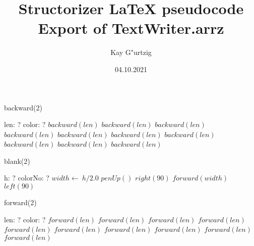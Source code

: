 \documentclass[a4paper,10pt]{article}
\title{Structorizer LaTeX pseudocode Export of TextWriter.arrz}
\author{Kay G"urtzig}
\date{04.10.2021}
\begin{document}
\begin{algorithm}
\caption{backward(2)}
\begin{algorithmic}[5]
    \State len: ?
    \State color: ?
  \EndDecl
      \State \(backward(len)\)
    \EndSelector
      \State \(backward(len)\)
    \EndSelector
      \State \(backward(len)\)
    \EndSelector
      \State \(backward(len)\)
    \EndSelector
      \State \(backward(len)\)
    \EndSelector
      \State \(backward(len)\)
    \EndSelector
      \State \(backward(len)\)
    \EndSelector
      \State \(backward(len)\)
    \EndSelector
      \State \(backward(len)\)
    \EndSelector
      \State \(backward(len)\)
    \EndSelector
  \EndCase
\EndProcedure
\end{algorithmic}
\end{algorithm}


\begin{algorithm}
\caption{blank(2)}
\begin{algorithmic}[5]
\State {}
    \State h: ?
    \State colorNo: ?
  \EndDecl
  \State \(width\gets\ h/2.0\)
  \State \(penUp()\)
  \State \(right(90)\)
  \State \(forward(width)\)
  \State \(left(90)\)
\EndProcedure
\end{algorithmic}
\end{algorithm}


\begin{algorithm}
\caption{forward(2)}
\begin{algorithmic}[5]
    \State len: ?
    \State color: ?
  \EndDecl
      \State \(forward(len)\)
    \EndSelector
      \State \(forward(len)\)
    \EndSelector
      \State \(forward(len)\)
    \EndSelector
      \State \(forward(len)\)
    \EndSelector
      \State \(forward(len)\)
    \EndSelector
      \State \(forward(len)\)
    \EndSelector
      \State \(forward(len)\)
    \EndSelector
      \State \(forward(len)\)
    \EndSelector
      \State \(forward(len)\)
    \EndSelector
      \State \(forward(len)\)
    \EndSelector
  \EndCase
\EndProcedure
\end{algorithmic}
\end{algorithm}
\end{document}
